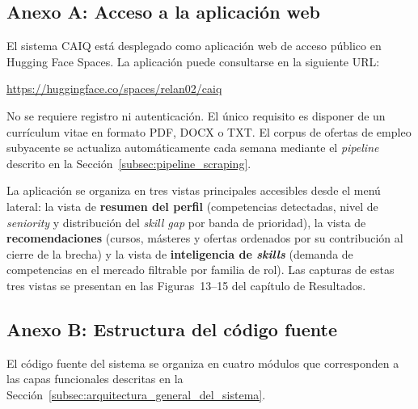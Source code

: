 
\subsection*{Anexo A: Acceso a la aplicación web}
\label{anexo:aplicacion}

El sistema CAIQ está desplegado como aplicación web de acceso público en Hugging Face
Spaces. La aplicación puede consultarse en la siguiente URL:

\begin{center}
  \url{https://huggingface.co/spaces/relan02/caiq}
\end{center}

No se requiere registro ni autenticación. El único requisito es disponer de un currículum
vitae en formato PDF, DOCX o TXT. El corpus de ofertas de empleo subyacente se actualiza
automáticamente cada semana mediante el \textit{pipeline} descrito en la
Sección~\ref{subsec:pipeline_scraping}.

La aplicación se organiza en tres vistas principales accesibles desde el menú lateral:
la vista de \textbf{resumen del perfil} (competencias detectadas, nivel de
\textit{seniority} y distribución del \textit{skill gap} por banda de prioridad), la
vista de \textbf{recomendaciones} (cursos, másteres y ofertas ordenados por su
contribución al cierre de la brecha) y la vista de \textbf{inteligencia de
\textit{skills}} (demanda de competencias en el mercado filtrable por familia de rol).
Las capturas de estas tres vistas se presentan en las Figuras~13--15 del
capítulo de Resultados.

\subsection*{Anexo B: Estructura del código fuente}
\label{anexo:codigo}

El código fuente del sistema se organiza en cuatro módulos que corresponden a las capas
funcionales descritas en la Sección~\ref{subsec:arquitectura_general_del_sistema}.

